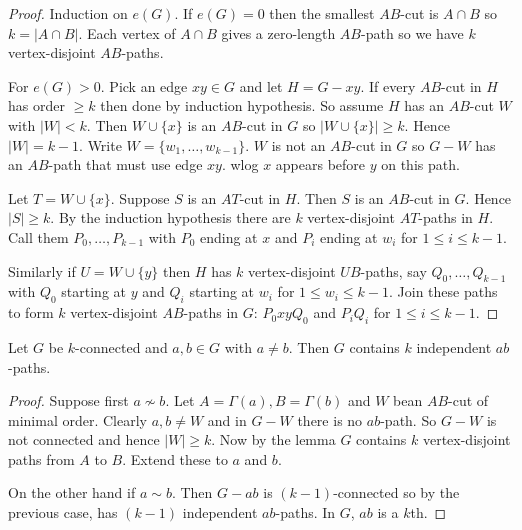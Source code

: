 \documentclass[a4paper]{article}
\begin{document}
\begin{proof}
  Induction on \(e(G)\). If \(e(G) = 0\) then the smallest \(AB\)-cut is \(A \cap B\) so \(k = |A \cap B|\). Each vertex of \(A \cap B\) gives a zero-length \(AB\)-path so we have \(k\) vertex-disjoint \(AB\)-paths.

  For \(e(G) > 0\). Pick an edge \(xy \in G\) and let \(H = G - xy\). If every \(AB\)-cut in \(H\) has order \(\geq k\) then done by induction hypothesis. So assume \(H\) has an \(AB\)-cut \(W\) with \(|W| < k\). Then \(W \cup \{x\}\) is an \(AB\)-cut in \(G\) so \(|W \cup \{x\}| \geq k\). Hence \(|W| = k - 1\). Write \(W = \{w_1, \dots, w_{k - 1}\}\). \(W\) is not an \(AB\)-cut in \(G\) so \(G - W\) has an \(AB\)-path that must use edge \(xy\). wlog \(x\) appears before \(y\) on this path.

  Let \(T = W \cup \{x\}\). Suppose \(S\) is an \(AT\)-cut in \(H\). Then \(S\) is an \(AB\)-cut in \(G\). Hence \(|S| \geq k\). By the induction hypothesis there are \(k\) vertex-disjoint \(AT\)-paths in \(H\). Call them \(P_0, \dots, P_{k - 1}\) with \(P_0\) ending at \(x\) and \(P_i\) ending at \(w_i\) for \(1 \leq i \leq k - 1\).

  Similarly if \(U = W \cup \{y\}\) then \(H\) has \(k\) vertex-disjoint \(UB\)-paths, say \(Q_0, \dots, Q_{k - 1}\) with \(Q_0\) starting at \(y\) and \(Q_i\) starting at \(w_i\) for \(1 \leq w_i \leq k - 1\). Join these paths to form \(k\) vertex-disjoint \(AB\)-paths in \(G\): \(P_0 xy Q_0\) and \(P_iQ_i\) for \(1 \leq i \leq k - 1\).
\end{proof}

\begin{theorem}[Menger]
  Let \(G\) be \(k\)-connected and \(a, b \in G\) with \(a \neq b\). Then \(G\) contains \(k\) independent \(ab\)-paths.
\end{theorem}

\begin{proof}
  Suppose first \(a \nsim b\). Let \(A = \Gamma(a), B = \Gamma(b)\) and \(W\) bean \(AB\)-cut of minimal order. Clearly \(a, b \neq W\) and in \(G - W\) there is no \(ab\)-path. So \(G - W\) is not connected and hence \(|W| \geq k\). Now by the lemma \(G\) contains \(k\) vertex-disjoint paths from \(A\) to \(B\). Extend these to \(a\) and \(b\).

  On the other hand if \(a \sim b\). Then \(G - ab\) is \((k - 1)\)-connected so by the previous case, has \((k - 1)\) independent \(ab\)-paths. In \(G\), \(ab\) is a \(k\)th.
\end{proof}
\end{document}
